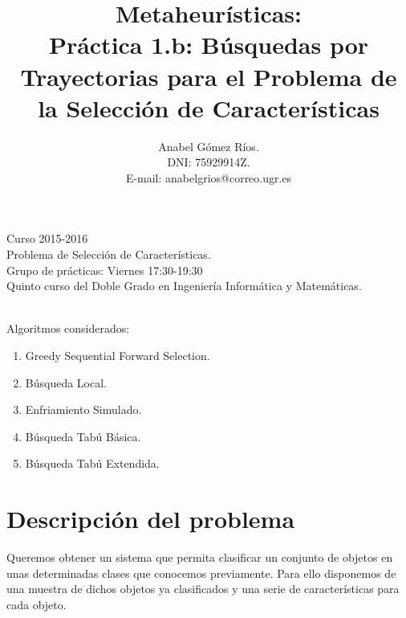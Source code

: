 \documentclass[12pt]{article}
\title{Metaheur\'isticas:\\
 Pr\'actica 1.b: B\'usquedas por Trayectorias para el Problema de la Selecci\'on de Caracter\'isticas}
\author{Anabel G\'omez R\'ios.\\
 DNI: 75929914Z.\\
 E-mail: anabelgrios@correo.ugr.es}
\begin{document}
\maketitle

\begin{center}
Curso 2015-2016\\

Problema de Selección de Características.\\ 

Grupo de prácticas: Viernes 17:30-19:30\\

Quinto curso del Doble Grado en Ingeniería Informática y Matemáticas.\\
\textit{ }\\
\end{center}

Algoritmos considerados:
\begin{enumerate}
\item Greedy Sequential Forward Selection.
\item Búsqueda Local.
\item Enfriamiento Simulado.
\item Búsqueda Tabú Básica.
\item Búsqueda Tabú Extendida.
\end{enumerate}

\newpage

\tableofcontents

\newpage

\section{Descripción del problema}
Queremos obtener un sistema que permita clasificar un conjunto de objetos en unas determinadas clases que conocemos previamente. Para ello disponemos de una muestra de dichos objetos ya clasificados y una serie de características para cada objeto.\\
\end{document}
